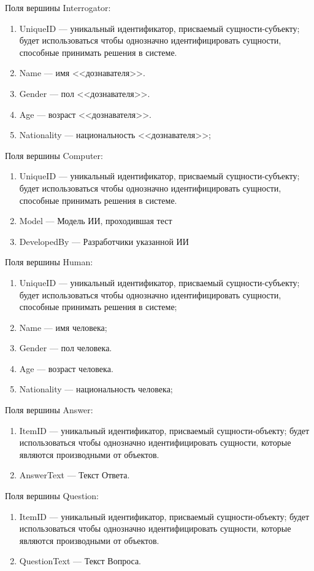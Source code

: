 Поля вершины Interrogator: 
\begin{enumerate}
    \item UniqueID --- уникальный идентификатор, присваемый сущности-субъекту; будет использоваться чтобы однозначно идентифицировать сущности, способные принимать решения в системе.  
    \item Name --- имя <<дознавателя>>.
    \item Gender --- пол <<дознавателя>>.
    \item Age --- возраст <<дознавателя>>.
    \item Nationality --- национальность <<дознавателя>>;
\end{enumerate}
Поля вершины Computer:
\begin{enumerate}
    \item UniqueID --- уникальный идентификатор, присваемый сущности-субъекту; будет использоваться чтобы однозначно идентифицировать сущности, способные принимать решения в системе.  
    \item Model --- Модель ИИ, проходившая тест
    \item DevelopedBy --- Разработчики указанной ИИ
\end{enumerate}
Поля вершины Human:
\begin{enumerate}
    \item UniqueID --- уникальный идентификатор, присваемый сущности-субъекту; будет использоваться чтобы однозначно идентифицировать сущности, способные принимать решения в системе;  
    \item Name --- имя человека;
    \item Gender --- пол человека.
    \item Age --- возраст человека.
    \item Nationality --- национальность человека;
\end{enumerate}
Поля вершины Answer:
\begin{enumerate}
    \item ItemID --- уникальный идентификатор, присваемый сущности-объекту; будет использоваться чтобы однозначно идентифицировать сущности, которые являются производными от объектов.
    \item AnswerText --- Текст Ответа.
\end{enumerate}
Поля вершины Question:
\begin{enumerate}
    \item ItemID --- уникальный идентификатор, присваемый сущности-объекту; будет использоваться чтобы однозначно идентифицировать сущности, которые являются производными от объектов.
    \item QuestionText --- Текст Вопроса.
\end{enumerate}
